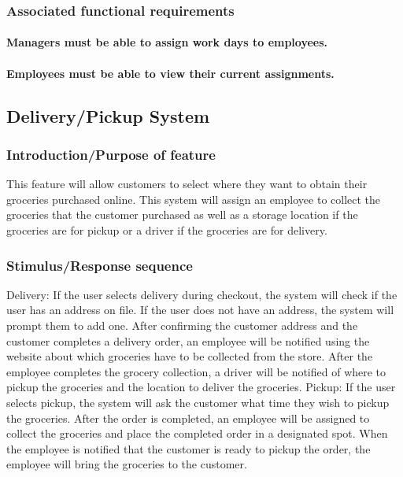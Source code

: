 \documentclass{scrreprt}
\theoremstyle{funreq}
\begin{document}
	\subsubsection{Associated functional requirements}
	\paragraph[]{\normalfont Managers must be able to assign work days to employees.}
	\paragraph[]{\normalfont Employees must be able to view their current assignments.}
	
	\subsection{Delivery/Pickup System}
	\subsubsection{Introduction/Purpose of feature}
	This feature will allow customers to select where they want to obtain their groceries purchased online.  This system will assign an employee to collect the groceries that the customer purchased as well as a storage location if the groceries are for pickup or a driver if the groceries are for delivery.
	\subsubsection{Stimulus/Response sequence}
	Delivery: If the user selects delivery during checkout, the system will check if the user has an address on file.  If the user does not have an address, the system will prompt them to add one.  After confirming the customer address and the customer completes a delivery order, an employee will be notified using the website about which groceries have to be collected from the store.  After the employee completes the grocery collection, a driver will be notified of where to pickup the groceries and the location to deliver the groceries.
	Pickup: If the user selects pickup, the system will ask the customer what time they wish to pickup the groceries.  After the order is completed, an employee will be assigned to collect the groceries and place the completed order in a designated spot.  When the employee is notified that the customer is ready to pickup the order, the employee will bring the groceries to the customer.
	
\end{document}

